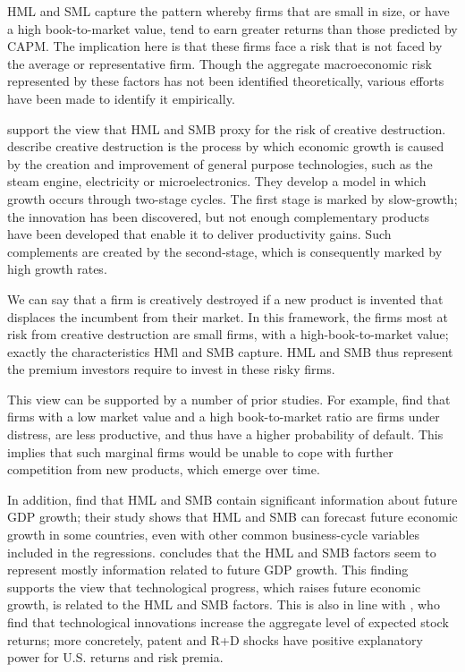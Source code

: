 \documentclass[12pt]{article}
\begin{document}
		HML and SML capture the pattern whereby firms that are small in size, or have a high book-to-market value, tend to earn greater returns than those predicted by CAPM. The implication here is that these firms face a risk that is not faced by the average or representative firm. Though the aggregate macroeconomic risk represented by these factors has not been identified theoretically, various efforts have been made to identify it empirically. 

		\citet{grammig2010} support the view that HML and SMB proxy for the risk of creative destruction. \citet{helpman1994} describe creative destruction is the process by which economic growth is caused by the creation and improvement of general purpose technologies, such as the steam engine, electricity or microelectronics. They develop a model in which growth occurs through two-stage cycles. The first stage is marked by slow-growth; the innovation has been discovered, but not enough complementary products have been developed that enable it to deliver productivity gains. Such complements are created by the second-stage, which is consequently marked by high growth rates.

		 We can say that a firm is creatively destroyed if a new product is invented that displaces the incumbent from their market. In this framework, the firms most at risk from creative destruction are small firms, with a high-book-to-market value; exactly the characteristics HMl and SMB capture. HML and SMB thus represent the premium investors require to invest in these risky firms.

		This view can be supported by a number of prior studies. For example, \citet{chanchen1991} find that firms with a low market value and a high book-to-market ratio are firms under distress, are less productive, and thus have a higher probability of default. This implies that such marginal firms would be unable to cope with further competition from new products, which emerge over time.

		In addition, \citet{liew2000} find that HML and SMB contain significant information about future GDP growth; their study shows that HML and SMB can forecast future economic growth in some countries, even with other common business-cycle variables included in the regressions. \citet{vassalou2003} concludes that the HML and SMB factors seem to represent mostly information related to future GDP growth. This finding supports the view that technological progress, which raises future economic growth, is related to the HML and SMB factors. This is also in line with \citet{hsu2009}, who find that technological innovations increase the aggregate level of expected stock returns; more concretely, patent and R+D shocks have positive explanatory power for U.S. returns and risk premia.
\end{document}
